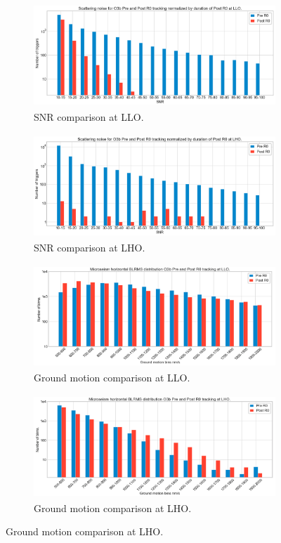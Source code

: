 \documentclass[12pt]{iopart}
\begin{document}
\begin{figure}[h]
\captionsetup[subfigure]{font=scriptsize,labelfont=scriptsize}
   \centering
    \begin{subfigure}[b]{0.45\textwidth}
        \centering
         \includegraphics[width= \textwidth,height=3.9cm]{snr_preandpostLLO.png}
         \caption{SNR comparison at LLO.}
         \label{fig:snr_r0}
    \end{subfigure}
    \hfill
    \begin{subfigure}[b]{0.45\textwidth}
        \centering
         \includegraphics[width =\textwidth,height=3.9cm]{snr_preandpostLHO.png}
         \caption{SNR comparison  at LHO.}
         \label{fig:rate_r0}
    \end{subfigure}
    \par\bigskip
    \begin{subfigure}[b]{0.45\textwidth}
        \centering
         \includegraphics[width= \textwidth,height=3.9cm]{micro_preandpostLLO.png}
         \caption{Ground motion comparison at LLO.}
         
         \label{fig:snr_r0}
    \end{subfigure}
    \hfill
    \begin{subfigure}[b]{0.45\textwidth}
        \centering
         \includegraphics[width =\textwidth,height=3.9cm]{micro_preandpostLHO.png}
         \caption{Ground motion comparison at LHO.}
         \label{fig:rate_r0}
    \end{subfigure}
    

\end{figure}
\end{document}
